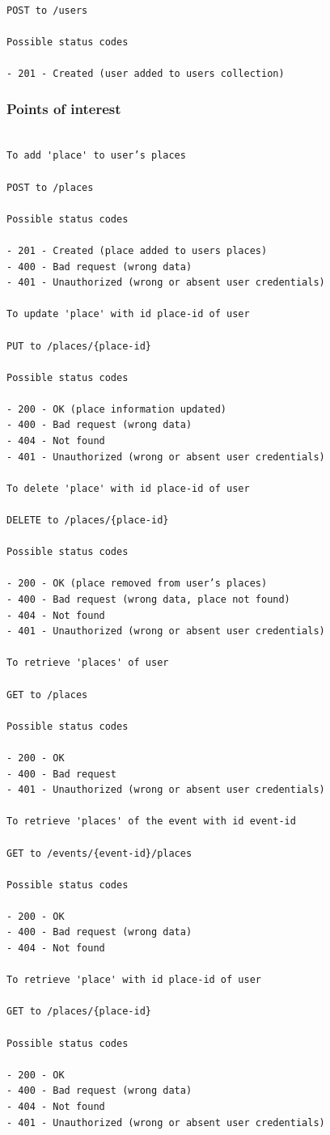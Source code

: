 \documentclass[thesis=M,english]{FITthesis}[2012/10/20]
\begin{document}
\begin{lstlisting}

POST to /users

Possible status codes

- 201 - Created (user added to users collection)

\end{lstlisting}

\subsubsection{Points of interest}

\begin{lstlisting}

To add 'place' to user’s places

POST to /places

Possible status codes

- 201 - Created (place added to users places)
- 400 - Bad request (wrong data)
- 401 - Unauthorized (wrong or absent user credentials)

To update 'place' with id place-id of user 

PUT to /places/{place-id} 

Possible status codes

- 200 - OK (place information updated)
- 400 - Bad request (wrong data)
- 404 - Not found
- 401 - Unauthorized (wrong or absent user credentials)

To delete 'place' with id place-id of user 

DELETE to /places/{place-id}

Possible status codes

- 200 - OK (place removed from user’s places)
- 400 - Bad request (wrong data, place not found)
- 404 - Not found
- 401 - Unauthorized (wrong or absent user credentials)

To retrieve 'places' of user 

GET to /places

Possible status codes

- 200 - OK 
- 400 - Bad request
- 401 - Unauthorized (wrong or absent user credentials)

To retrieve 'places' of the event with id event-id 

GET to /events/{event-id}/places

Possible status codes

- 200 - OK 
- 400 - Bad request (wrong data)
- 404 - Not found

To retrieve 'place' with id place-id of user 

GET to /places/{place-id}

Possible status codes

- 200 - OK 
- 400 - Bad request (wrong data)
- 404 - Not found
- 401 - Unauthorized (wrong or absent user credentials)
\end{lstlisting}
\end{document}

